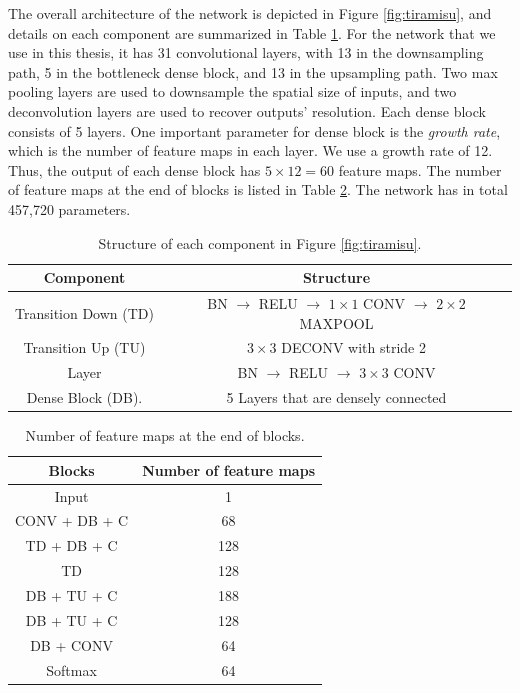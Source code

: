 The overall architecture of the network is depicted in Figure \ref{fig:tiramisu}, and details on each component are summarized in Table \ref{table:components}. For the network that we use in this thesis, it has 31 convolutional layers, with 13 in the downsampling path, 5 in the bottleneck dense block, and 13 in the upsampling path. Two max pooling layers are used to downsample the spatial size of inputs, and two deconvolution layers are used to recover outputs' resolution. Each dense block consists of 5 layers. One important parameter for dense block is the \textit{growth rate}, which is the number of feature maps in each layer. We use a growth rate of 12. Thus, the output of each dense block has $5 \times 12 = 60$ feature maps. The number of feature maps at the end of blocks is listed in Table \ref{table:number_feature_maps}. The network has in total 457,720 parameters.

\begin{table}[H]
\centering  
\begin{tabularx}{.9\textwidth}{c|c}
    \hline
    Component            & Structure            \\ \hline \hline
    Transition Down (TD) & BN $\rightarrow$ RELU $\rightarrow$ $1 \times 1$ CONV $\rightarrow$ $2 \times 2$ MAXPOOL \\ \hline
    Transition Up (TU)   & $3 \times 3$ DECONV with stride 2 \\
   \hline
   Layer                 & BN $\rightarrow$ RELU $\rightarrow$ $3 \times 3$ CONV \\ \hline
   Dense Block (DB).     & 5 Layers that are densely connected \\ \hline
  \end{tabularx}
\caption{Structure of each component in Figure \ref{fig:tiramisu}.}
\label{table:components}
\end{table}

\begin{table}[H]
\centering  
\begin{tabularx}{.53\textwidth}{c|c}
    \hline
    Blocks            & Number of feature maps            \\ \hline \hline
    Input                &    1 \\ \hline
    CONV + DB + C        &    68 \\ \hline
    TD + DB + C          &    128 \\ \hline
    TD                   &    128 \\ \hline
    DB + TU + C          &    188 \\ \hline
    DB + TU + C          &    128 \\ \hline
    DB + CONV            &    64 \\ \hline
    Softmax           &    64 \\ \hline
  \end{tabularx}
\caption{Number of feature maps at the end of blocks.}
\label{table:number_feature_maps}
\end{table}

